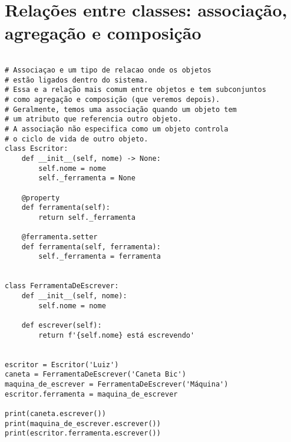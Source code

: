 \documentclass{article}
\begin{document}
\section{Relações entre classes: associação, agregação e composição}
\begin{lstlisting}
    
# Associaçao e um tipo de relacao onde os objetos
# estão ligados dentro do sistema.
# Essa e a relação mais comum entre objetos e tem subconjuntos
# como agregação e composição (que veremos depois).
# Geralmente, temos uma associação quando um objeto tem
# um atributo que referencia outro objeto.
# A associação não especifica como um objeto controla
# o ciclo de vida de outro objeto.
class Escritor:
    def __init__(self, nome) -> None:
        self.nome = nome
        self._ferramenta = None

    @property
    def ferramenta(self):
        return self._ferramenta

    @ferramenta.setter
    def ferramenta(self, ferramenta):
        self._ferramenta = ferramenta


class FerramentaDeEscrever:
    def __init__(self, nome):
        self.nome = nome

    def escrever(self):
        return f'{self.nome} está escrevendo'


escritor = Escritor('Luiz')
caneta = FerramentaDeEscrever('Caneta Bic')
maquina_de_escrever = FerramentaDeEscrever('Máquina')
escritor.ferramenta = maquina_de_escrever

print(caneta.escrever())
print(maquina_de_escrever.escrever())
print(escritor.ferramenta.escrever())
    
\end{lstlisting}
\end{document}
